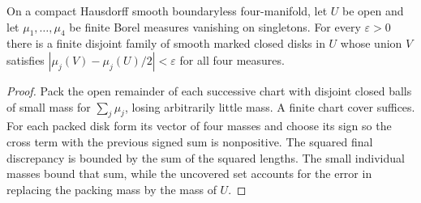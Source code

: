\begin{theorem}
\label{thm:ed03-atlas-division}
\leanok
On a compact Hausdorff smooth boundaryless four-manifold, let $U$ be
open and let $\mu_1,\ldots,\mu_4$ be finite Borel measures vanishing on
singletons. For every $\varepsilon>0$ there is a finite disjoint family
of smooth marked closed disks in $U$ whose union $V$ satisfies
$|\mu_j(V)-\mu_j(U)/2|<\varepsilon$ for all four measures.
\end{theorem}
\begin{proof}
\leanok
Pack the open remainder of each successive chart with disjoint closed
balls of small mass for $\sum_j\mu_j$, losing arbitrarily little mass.
A finite chart cover suffices. For each packed disk form its vector of
four masses and choose its sign so the cross term with the previous
signed sum is nonpositive. The squared final discrepancy is bounded by
the sum of the squared lengths. The small individual masses bound that
sum, while the uncovered set accounts for the error in replacing the
packing mass by the mass of $U$.
\end{proof}

